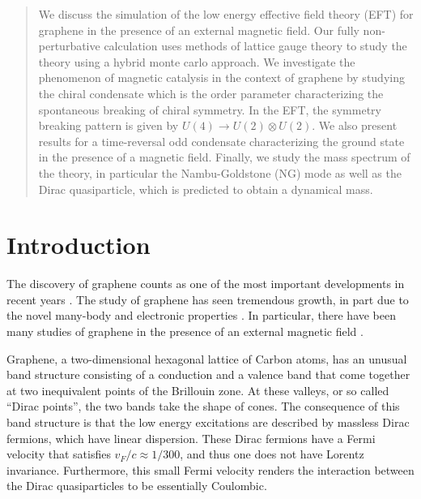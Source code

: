 \documentclass[aps,prd,twocolumn,showpacs,superscriptaddress,groupedaddress]{revtex4}  %
\begin{document}
\begin{abstract}
We discuss the simulation of the low energy effective field theory (EFT) for graphene in the presence of an external magnetic field. Our fully non-perturbative calculation 
uses methods of lattice gauge theory to study the theory using a hybrid monte carlo approach. We investigate the phenomenon of magnetic catalysis in the context of graphene by studying
the chiral condensate which is the order parameter characterizing the spontaneous breaking of chiral symmetry. In the EFT, the symmetry breaking pattern is given by $U(4) \to U(2) \otimes U(2)$. We also present results for a time-reversal odd condensate characterizing the ground state in the presence of a magnetic field.
Finally, we study the mass spectrum of the theory, in particular the Nambu-Goldstone (NG) mode as well as the Dirac quasiparticle, which is predicted to obtain a dynamical mass. 
\end{abstract}

\maketitle

\section{\label{sec:Intro}Introduction}
The discovery of graphene counts as one of the most important developments in recent years \cite{Novoselov}. The study of graphene has seen tremendous growth,
in part due to the novel many-body and electronic properties \cite{CastroNeto}. In particular, there have been many studies of graphene
in the presence of an external magnetic field \cite{Goerbig}.

Graphene, a two-dimensional hexagonal lattice of Carbon atoms, has an unusual band structure consisting of a conduction and a valence band that come together at two inequivalent points 
of the Brillouin zone. At these valleys, or so called ``Dirac points'', the two bands take the shape of cones. The consequence of this band structure is that the low energy excitations are described by massless Dirac fermions, which have linear dispersion.
These Dirac fermions have a Fermi velocity that satisfies $v_F/c \approx 1/300$, and thus one does not have Lorentz invariance. Furthermore, this small Fermi velocity renders the interaction between the Dirac quasiparticles 
to be essentially Coulombic.
\end{document}
